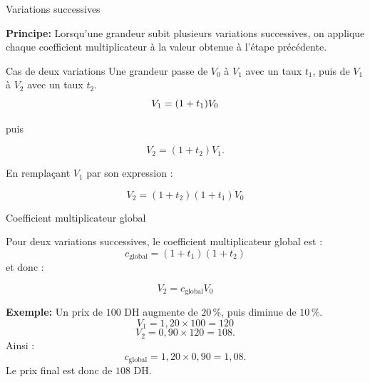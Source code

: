 \documentclass[aspectratio=169,11pt]{beamer}
\begin{document}
\begin{frame}{Variations successives}	
	
	
	\begin{definitionbox}
		\textbf{Principe: }Lorsqu'une grandeur subit plusieurs variations successives,
		on applique chaque coefficient multiplicateur à la valeur obtenue
		à l'étape précédente.
	\end{definitionbox}
	
	\begin{exampleblock}{Cas de deux variations}
		Une grandeur passe de $V_0$ à $V_1$ avec un taux $t_1$, puis de
		$V_1$ à $V_2$ avec un taux $t_2$.
		\vspace{-0.3cm}
		\[
		V_1=(1+t_1)V_0 	\vspace{-0.3cm}
		\]
		
		puis 	\vspace{-0.7cm}
		
		\[
		V_2=(1+t_2)V_1.
		\]
		
		En remplaçant $V_1$ par son expression :
		
		\[
		\boxed{
			V_2=(1+t_2)(1+t_1)V_0
		}
		\]
	\end{exampleblock}
	
	
	
\end{frame}
\begin{frame}{Coefficient multiplicateur global}
	
	Pour deux variations successives, le coefficient multiplicateur global est :
	\vspace{-0.2cm}
	\[
	\boxed{
		c_{\mathrm{global}}=(1+t_1)(1+t_2)
	}
	\]
	\vspace{-0.4cm}
	et donc :
	
	\[
	\boxed{
		V_2=c_{\mathrm{global}}V_0
	}
	\]
	
	\vspace{-0.4cm}
	
	\begin{applicationbox}
		{	\bf Exemple:} 	Un prix de $100$ DH augmente de $20\,\%$, puis diminue de $10\,\%$.
		\vspace{-0.2cm}
		\[
		V_1=1{,}20\times100=120
		\]
		\vspace{-0.5cm}
		\[
		V_2=0{,}90\times120=108.
		\]
		\vspace{-0.4cm}
		Ainsi :
		\[
		c_{\mathrm{global}}=1{,}20\times0{,}90=1{,}08.
		\]
		\vspace{-0.2cm}
		Le prix final est donc de $108$ DH.
	\end{applicationbox}
\end{frame}
\end{document}
